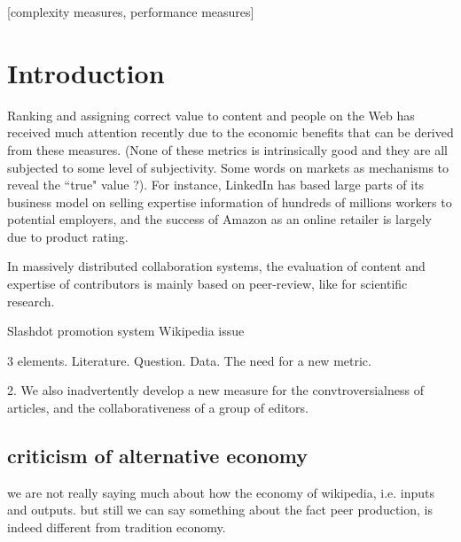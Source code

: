 \documentclass{acm_proc_article-sp}
\begin{document}
\date{23 February 2014}

\maketitle
\begin{abstract}


\end{abstract}

[complexity measures, performance measures]



\section{Introduction}
Ranking and assigning correct value to content and people on the Web has received much attention recently due to the economic benefits that can be derived from these measures. (None of these metrics is intrinsically good and they are all subjected to some level of subjectivity. Some words on markets as mechanisms to reveal the ``true" value ?). For instance, LinkedIn has based large parts of its business model on selling expertise information of hundreds of millions workers to potential employers, and the success of Amazon as an online retailer is largely due to product rating. 

In massively distributed collaboration systems, the evaluation of content and expertise of contributors is mainly based on peer-review, like for scientific research.

Slashdot promotion system \cite{}
Wikipedia issue \cite{halfaker2013}



3 elements. Literature. Question. Data. The need for a new metric.

2. We also inadvertently develop a new measure for the convtroversialness of articles, and the collaborativeness of a group of editors.

\subsection{criticism of alternative economy}
we are not really saying much about how the economy of wikipedia, i.e. inputs and outputs.
but still we can say something about the fact peer production, is indeed different from tradition economy.
\end{document}
